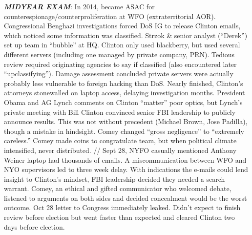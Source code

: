 \documentclass[
]{article}
\begin{document}
\textbf{\emph{MIDYEAR EXAM}}: In 2014, became ASAC for
counterespionage/counterproliferation at WFO (extraterritorial AOR).
Congressional Benghazi investigations forced DoS IG to release Clinton
emails, which noticed some information was classified. Strzok \& senior
analyst (``Derek'') set up team in ``bubble'' at HQ. Clinton only used
blackberry, but used several different servers (including one managed by
private company, PRN). Tedious review required originating agencies to
say if classified (also encountered later ``upclassifying''). Damage
assessment concluded private servers were actually probably less
vulnerable to foreign hacking than DoS. Nearly finished, Clinton's
attorneys stonewalled on laptop access, delaying investigation months.
President Obama and AG Lynch comments on Clinton ``matter'' poor optics,
but Lynch's private meeting with Bill Clinton convinced senior FBI
leadership to publicly announce results. This was not without precedent
(Michael Brown, Jose Padilla), though a mistake in hindsight. Comey
changed ``gross negligence'' to ``extremely careless.'' Comey made coins
to congratulate team, but when political climate intensified, never
distributed. // Sept 28, NYFO casually mentioned Anthony Weiner laptop
had thousands of emails. A miscommunication between WFO and NYO
supervisors led to three week delay. With indications the e-mails could
lend insight to Clinton's mindset, FBI leadership decided they needed a
search warrant. Comey, an ethical and gifted communicator who welcomed
debate, listened to arguments on both sides and decided concealment
would be the worst outcome. Oct 28 letter to Congress immediately
leaked. Didn't expect to finish review before election but went faster
than expected and cleared Clinton two days before election.
\end{document}
